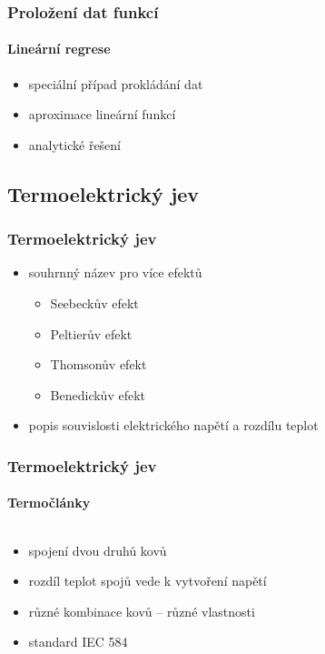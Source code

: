 \documentclass[smaller,aspectratio=1610,handout]{beamer}
\begin{document}
\begin{frame}
	\frametitle{Proložení dat funkcí}
	\framesubtitle{Lineární regrese}
	\begin{itemize}
		\item speciální případ prokládání dat
		\item aproximace lineární funkcí
		\item analytické řešení
	\end{itemize}
\end{frame}

\subsection{Termoelektrický jev}

\begin{frame}
	\frametitle{Termoelektrický jev}
	\begin{itemize}
		\item souhrnný název pro více efektů
			\begin{itemize}
				\item Seebeckův efekt
				\item Peltierův efekt
				\item Thomsonův efekt
				\item Benedickův efekt
			\end{itemize}
		\item popis souvislosti elektrického napětí a rozdílu teplot
	\end{itemize}
\end{frame}

\begin{frame}
	\frametitle{Termoelektrický jev}
	\framesubtitle{Termočlánky}
	\begin{columns}
		\begin{column}{0.6\textwidth}
			\begin{itemize}
				\item spojení dvou druhů kovů
				\item rozdíl teplot spojů vede k vytvoření napětí
				\item různé kombinace kovů -- různé vlastnosti
				\item standard IEC 584
			\end{itemize}
		\end{column}
		\begin{column}{0.4\textwidth}
		\end{column}
	\end{columns}
\end{frame}
\end{document}

